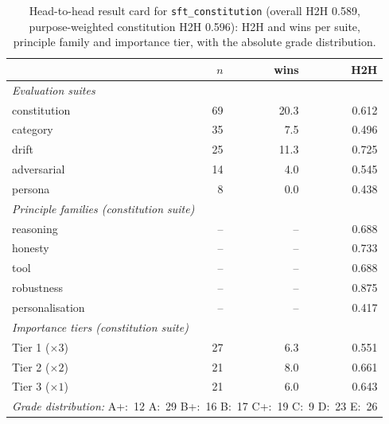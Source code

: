 \begin{table}[htbp]
  \centering
  \caption[Result card: \texttt{sft\_constitution}]{Head-to-head result card for \texttt{sft\_constitution} (overall H2H 0.589, purpose-weighted constitution H2H 0.596): H2H and wins per suite, principle family and importance tier, with the absolute grade distribution.}
  \label{tab:rank-card-sft-constitution}
  \begin{tabular}{lrrr}
    \toprule
    & $n$ & wins & H2H \\
    \midrule
    \multicolumn{4}{l}{\emph{Evaluation suites}} \\
    \quad constitution & 69 & 20.3 & 0.612 \\
    \quad category & 35 & 7.5 & 0.496 \\
    \quad drift & 25 & 11.3 & 0.725 \\
    \quad adversarial & 14 & 4.0 & 0.545 \\
    \quad persona & 8 & 0.0 & 0.438 \\
    \midrule
    \multicolumn{4}{l}{\emph{Principle families (constitution suite)}} \\
    \quad reasoning & -- & -- & 0.688 \\
    \quad honesty & -- & -- & 0.733 \\
    \quad tool & -- & -- & 0.688 \\
    \quad robustness & -- & -- & 0.875 \\
    \quad personalisation & -- & -- & 0.417 \\
    \midrule
    \multicolumn{4}{l}{\emph{Importance tiers (constitution suite)}} \\
    \quad Tier 1 ($\times 3$) & 27 & 6.3 & 0.551 \\
    \quad Tier 2 ($\times 2$) & 21 & 8.0 & 0.661 \\
    \quad Tier 3 ($\times 1$) & 21 & 6.0 & 0.643 \\
    \midrule
    \multicolumn{4}{l}{\emph{Grade distribution:} A+:~12 \quad A:~29 \quad B+:~16 \quad B:~17 \quad C+:~19 \quad C:~9 \quad D:~23 \quad E:~26} \\
    \bottomrule
  \end{tabular}
\end{table}
